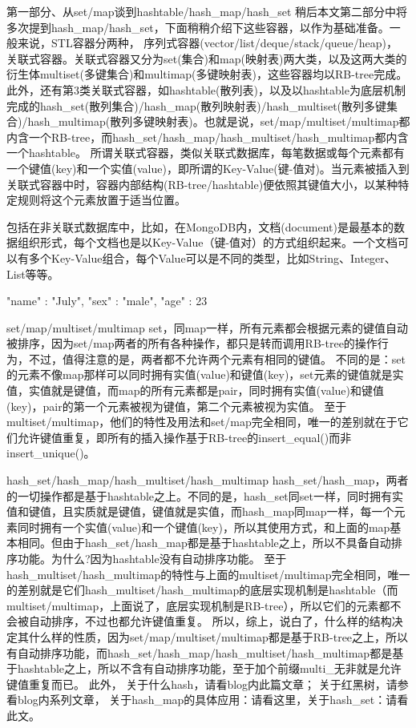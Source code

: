 第一部分、从set/map谈到hashtable/hash_map/hash_set
稍后本文第二部分中将多次提到hash_map/hash_set，下面稍稍介绍下这些容器，以作为基础准备。一般来说，STL容器分两种，
序列式容器(vector/list/deque/stack/queue/heap)，
关联式容器。关联式容器又分为set(集合)和map(映射表)两大类，以及这两大类的衍生体multiset(多键集合)和multimap(多键映射表)，这些容器均以RB-tree完成。此外，还有第3类关联式容器，如hashtable(散列表)，以及以hashtable为底层机制完成的hash_set(散列集合)/hash_map(散列映射表)/hash_multiset(散列多键集合)/hash_multimap(散列多键映射表)。也就是说，set/map/multiset/multimap都内含一个RB-tree，而hash_set/hash_map/hash_multiset/hash_multimap都内含一个hashtable。
所谓关联式容器，类似关联式数据库，每笔数据或每个元素都有一个键值(key)和一个实值(value)，即所谓的Key-Value(键-值对)。当元素被插入到关联式容器中时，容器内部结构(RB-tree/hashtable)便依照其键值大小，以某种特定规则将这个元素放置于适当位置。

包括在非关联式数据库中，比如，在MongoDB内，文档(document)是最基本的数据组织形式，每个文档也是以Key-Value（键-值对）的方式组织起来。一个文档可以有多个Key-Value组合，每个Value可以是不同的类型，比如String、Integer、List等等。
 
{ "name" : "July",  
	"sex" : "male",  
	"age" : 23 }  

set/map/multiset/multimap
set，同map一样，所有元素都会根据元素的键值自动被排序，因为set/map两者的所有各种操作，都只是转而调用RB-tree的操作行为，不过，值得注意的是，两者都不允许两个元素有相同的键值。
不同的是：set的元素不像map那样可以同时拥有实值(value)和键值(key)，set元素的键值就是实值，实值就是键值，而map的所有元素都是pair，同时拥有实值(value)和键值(key)，pair的第一个元素被视为键值，第二个元素被视为实值。
至于multiset/multimap，他们的特性及用法和set/map完全相同，唯一的差别就在于它们允许键值重复，即所有的插入操作基于RB-tree的insert_equal()而非insert_unique()。

hash_set/hash_map/hash_multiset/hash_multimap
hash_set/hash_map，两者的一切操作都是基于hashtable之上。不同的是，hash_set同set一样，同时拥有实值和键值，且实质就是键值，键值就是实值，而hash_map同map一样，每一个元素同时拥有一个实值(value)和一个键值(key)，所以其使用方式，和上面的map基本相同。但由于hash_set/hash_map都是基于hashtable之上，所以不具备自动排序功能。为什么?因为hashtable没有自动排序功能。
至于hash_multiset/hash_multimap的特性与上面的multiset/multimap完全相同，唯一的差别就是它们hash_multiset/hash_multimap的底层实现机制是hashtable（而multiset/multimap，上面说了，底层实现机制是RB-tree），所以它们的元素都不会被自动排序，不过也都允许键值重复。
所以，综上，说白了，什么样的结构决定其什么样的性质，因为set/map/multiset/multimap都是基于RB-tree之上，所以有自动排序功能，而hash_set/hash_map/hash_multiset/hash_multimap都是基于hashtable之上，所以不含有自动排序功能，至于加个前缀multi_无非就是允许键值重复而已。
此外，
关于什么hash，请看blog内此篇文章；
关于红黑树，请参看blog内系列文章，
关于hash_map的具体应用：请看这里，关于hash_set：请看此文。

